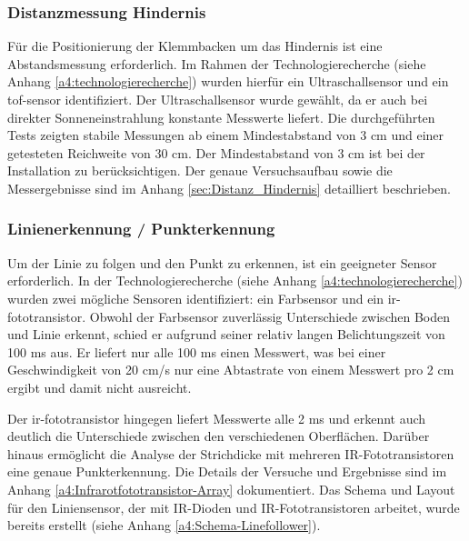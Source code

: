 \documentclass[../main.tex]{subfiles}
\begin{document}
\subsubsection{Distanzmessung Hindernis}
Für die Positionierung der Klemmbacken um das Hindernis ist eine Abstandsmessung erforderlich. Im Rahmen der Technologierecherche (siehe Anhang \ref{a4:technologierecherche}) wurden hierfür ein Ultraschallsensor und ein \acrshort{tof-sensor} identifiziert. Der Ultraschallsensor wurde gewählt, da er auch bei direkter Sonneneinstrahlung konstante Messwerte liefert. Die durchgeführten Tests zeigten stabile Messungen ab einem Mindestabstand von 3 cm und einer getesteten Reichweite von 30 cm. Der Mindestabstand von 3 cm ist bei der Installation zu berücksichtigen. Der genaue Versuchsaufbau sowie die Messergebnisse sind im Anhang \ref{sec:Distanz_Hindernis} detailliert beschrieben.

\subsubsection{Linienerkennung / Punkterkennung}
Um der Linie zu folgen und den Punkt zu erkennen, ist ein geeigneter Sensor erforderlich. In der Technologierecherche (siehe Anhang \ref{a4:technologierecherche}) wurden zwei mögliche Sensoren identifiziert: ein Farbsensor und ein \gls{ir-fototransistor}. Obwohl der Farbsensor zuverlässig Unterschiede zwischen Boden und Linie erkennt, schied er aufgrund seiner relativ langen Belichtungszeit von 100 ms aus. Er liefert nur alle 100 ms einen Messwert, was bei einer Geschwindigkeit von 20 cm/s nur eine Abtastrate von einem Messwert pro 2 cm ergibt und damit nicht ausreicht.

Der \gls{ir-fototransistor} hingegen liefert Messwerte alle 2 ms und erkennt auch deutlich die Unterschiede zwischen den verschiedenen Oberflächen. Darüber hinaus ermöglicht die Analyse der Strichdicke mit mehreren IR-Fototransistoren eine genaue Punkterkennung. Die Details der Versuche und Ergebnisse sind im Anhang \ref{a4:Infrarotfototransistor-Array} dokumentiert.
Das Schema und Layout für den Liniensensor, der mit IR-Dioden und IR-Fototransistoren arbeitet, wurde bereits erstellt (siehe Anhang \ref{a4:Schema-Linefollower}).
\end{document}
